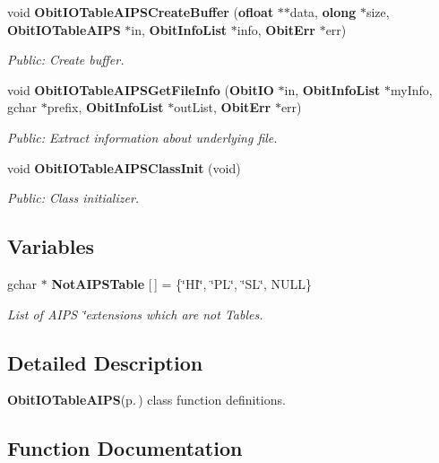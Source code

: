 \begin{CompactItemize}
void {\bf Obit\-IOTable\-AIPSCreate\-Buffer} ({\bf ofloat} $\ast$$\ast$data, {\bf olong} $\ast$size, {\bf Obit\-IOTable\-AIPS} $\ast$in, {\bf Obit\-Info\-List} $\ast$info, {\bf Obit\-Err} $\ast$err)
\begin{CompactList}\small\item\em Public: Create buffer. \item\end{CompactList}\item 
void {\bf Obit\-IOTable\-AIPSGet\-File\-Info} ({\bf Obit\-IO} $\ast$in, {\bf Obit\-Info\-List} $\ast$my\-Info, gchar $\ast$prefix, {\bf Obit\-Info\-List} $\ast$out\-List, {\bf Obit\-Err} $\ast$err)
\begin{CompactList}\small\item\em Public: Extract information about underlying file. \item\end{CompactList}\item 
void {\bf Obit\-IOTable\-AIPSClass\-Init} (void)
\begin{CompactList}\small\item\em Public: Class initializer. \item\end{CompactList}\end{CompactItemize}
\subsection*{Variables}
\begin{CompactItemize}
\item 
gchar $\ast$ {\bf Not\-AIPSTable} [$\,$] = \{\char`\"{}HI\char`\"{}, \char`\"{}PL\char`\"{}, \char`\"{}SL\char`\"{}, NULL\}
\begin{CompactList}\small\item\em List of AIPS \char`\"{}extensions which are not Tables. \item\end{CompactList}\end{CompactItemize}


\subsection{Detailed Description}
{\bf Obit\-IOTable\-AIPS}{\rm (p.\,\pageref{structObitIOTableAIPS})} class function definitions. 



\subsection{Function Documentation}
